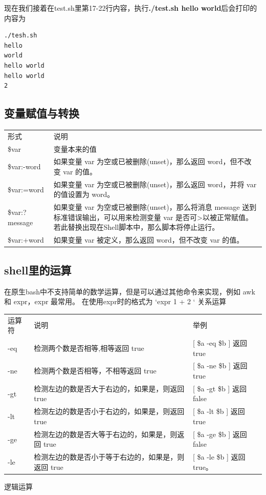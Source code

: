 现在我们接着在test.sh里第17-22行内容，执行\textbf{./test.sh hello world}后会打印的内容为
\begin{lstlisting}
./tesh.sh
hello
world
hello world
hello world
2
\end{lstlisting}
\subsection{变量赋值与转换} 

\begin{tabular}{ll}
形式  & 说明 \\
\${var} & 变量本来的值 \\
\${var:-word} & 如果变量 var 为空或已被删除(unset)，那么返回 word，但不改变 var 的值。 \\
\${var:=word} & 如果变量 var 为空或已被删除(unset)，那么返回 word，并将 var 的值设置为 word。 \\
\${var:?message} & 如果变量 var 为空或已被删除(unset)，那么将消息 message 送到标准错误输出，可以用来检测变量 var 是否可>以被正常赋值。 若此替换出现在Shell脚本中，那么脚本将停止运行。 \\
\${var:+word} & 如果变量 var 被定义，那么返回 word，但不改变 var 的值。
\end{tabular}
\subsection{shell里的运算} 
在原生bash中不支持简单的数学运算，但是可以通过其他命令来实现，例如 awk 和 expr，expr 最常用。
在使用expr时的格式为 `expr 1 + 2 `
关系运算

\begin{tabular}{lll}
运算符 & 说明 & 举例 \\
-eq & 检测两个数是否相等,相等返回 true &  [ \$a -eq \$b ] 返回 true \\
-ne & 检测两个数是否相等，不相等返回 true &  [ \$a -ne \$b ] 返回 true \\
-gt & 检测左边的数是否大于右边的，如果是，则返回 true &  [ \$a -gt \$b ] 返回 false \\
-lt & 检测左边的数是否小于右边的，如果是，则返回 true &  [ \$a -lt \$b ] 返回 true \\
-ge & 检测左边的数是否大等于右边的，如果是，则返回 true &  [ \$a -ge \$b ] 返回 false \\
-le & 检测左边的数是否小于等于右边的，如果是，则返回 true &  [ \$a -le \$b ] 返回 true。
\end{tabular}

逻辑运算

